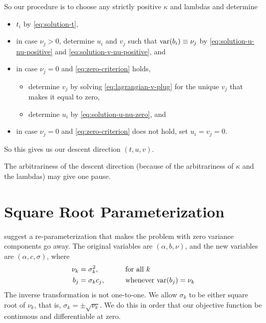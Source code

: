 So our procedure is to choose any strictly positive $\kappa$ and lambdas
and determine
\begin{itemize}
\item $t_i$ by \eqref{eq:solution-t},
\item in case $\nu_j > 0$, determine $u_i$ and $v_j$
    such that $\operatorname{var}(b_i) \equiv \nu_j$ by
    \eqref{eq:solution-u-nu-positive} and \eqref{eq:solution-v-nu-positive},
    and
\item in case $\nu_j = 0$ and \eqref{eq:zero-criterion} holds,
\begin{itemize}
\item determine $v_j$ by solving \eqref{eq:lagrangian-v-plug} for the
    unique $v_j$ that makes it equal to zero,
\item determine $u_i$ by \eqref{eq:solution-u-nu-zero}, and
\end{itemize}
\item in case $\nu_j = 0$ and \eqref{eq:zero-criterion} does not hold,
    set $u_i = v_j = 0$.
\end{itemize}
So this gives us our descent direction $(t, u, v)$.

The arbitrariness of the descent direction (because of the arbitrariness
of $\kappa$ and the lambdas) may give one pause.

\section{Square Root Parameterization}

\citet{reaster} suggest a re-parameterization that makes the problem with
zero variance components go away.
The original variables are $(\alpha, b, \nu)$, and
the new variables are $(\alpha, c, \sigma)$, where
\begin{alignat*}{2}
   \nu_k & = \sigma^2_k, & \qquad & \text{for all $k$}
   \\
   b_j & = \sigma_k c_j, & & \text{whenever $\operatorname{var}(b_j) = \nu_k$}
\end{alignat*}
The inverse transformation is not one-to-one.  We allow $\sigma_k$ to be
either square root of $\nu_k$, that is, $\sigma_k = \pm \sqrt{\nu_k}$.
We do this in order that our objective function be continuous and
differentiable at zero.

